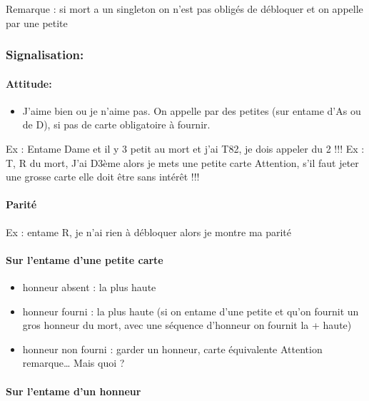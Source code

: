 \documentclass[a4paper]{article}
\begin{document}
Remarque : si mort a un singleton on n’est pas obligés de débloquer et on appelle par une petite

\subsubsection{Signalisation:}

\paragraph{Attitude:}

\begin{itemize}
\item J’aime bien ou je n’aime pas. On appelle par des petites (sur entame d’As ou de D), si pas de carte obligatoire à fournir.

\end{itemize}

Ex : Entame Dame et il y 3 petit au mort et j’ai T82, je dois appeler du 2 !!!
Ex : T, R du mort, J’ai D3ème alors je mets une petite carte
Attention, s’il faut jeter une grosse carte elle doit être sans intérêt !!!

\paragraph{Parité}

Ex : entame R, je n’ai rien à débloquer alors je montre ma parité

\paragraph{Sur l’entame d’une petite carte}

\begin{itemize}
\item honneur absent : la plus haute

\item honneur fourni : la plus haute (si on entame d’une petite et qu’on fournit un gros honneur du mort, avec une séquence d’honneur on fournit la + haute)

\item honneur non fourni : garder un honneur, carte équivalente
Attention remarque… Mais quoi ?

\end{itemize}

\paragraph{Sur l’entame d’un honneur}
\end{document}
